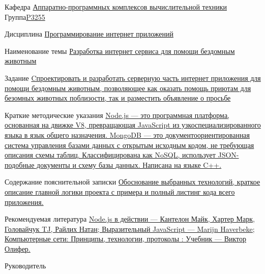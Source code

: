 \documentclass[12pt]{article}
\begin{document}
\bigskip
\normalsize \noindent Кафедра \uline{ Аппаратно-программных комплексов вычислительной техники } Группа\uline{\hspace{15pt}P3255\hspace*{\fill}}
\bigskip

\normalsize \noindent Дисциплина \uline{\hspace{90pt}Программирование интернет приложений\hspace*{\fill}}
\bigskip

\normalsize \noindent Наименование темы  \uline{\hspace{20pt}Разработка интернет сервиса для помощи бездомным животным\hspace*{\fill}}
\bigskip

\normalsize \noindent Задание \uline{\hspace{10pt} Cпроектировать и разработать серверную часть интернет приложения для помощи бездомным животным, позволяющее как оказать помощь приютам для безомных животных поблизости, так и разместить объявление о просьбе\hspace*{\fill}}
\bigskip

\normalsize \noindent Краткие методические указания  \uline{\hspace{10pt} Node.js --- это программная платформа, основанная на движке V8, превращающая JavaScript из узкоспециализированного языка в язык общего назначения. MongoDB --- это документоориентированная система управления базами данных с открытым исходным кодом, не требующая описания схемы таблиц. Классифицирована как NoSQL, использует JSON-подобные документы и схему базы данных. Написана на языке C++. \hspace*{\fill}}
\bigskip 

\normalsize \noindent Содержание пояснительной записки  \uline{\hspace{10pt} Обоснование выбранных технологий, краткое описание главной логики проекта с примера и полный листинг кода всего приложения. \hspace*{\fill}}
\bigskip

\normalsize \noindent Рекомендуемая литература \uline{\hspace{10pt} Node.js в действии --- Кантелон Майк, Хартер Марк, Головайчук TJ, Райлих Натан; Выразительный JavaScript --- Marijn Haverbeke; Компьютерные сети: Принципы, технологии, протоколы : Учебник --- Виктор Олифер. \hspace*{\fill}}


\bigskip\bigskip\bigskip\bigskip\bigskip
\normalsize \noindent Руководитель \hrulefill
\end{document}
